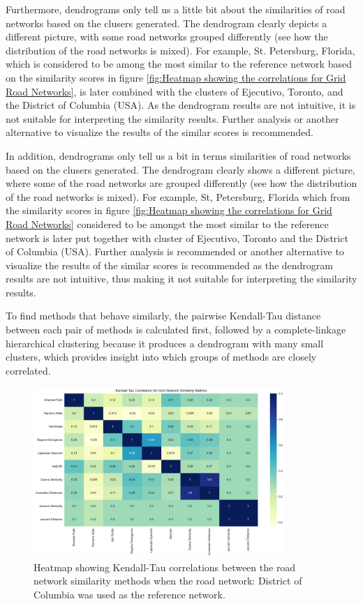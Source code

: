 Furthermore, dendrograms only tell us a little bit about the similarities of road networks based on the clusers generated. The dendrogram clearly depicts a different picture, with some road networks grouped differently (see how the distribution of the road networks is mixed). For example, St. Petersburg, Florida, which is considered to be among the most similar to the reference network based on the similarity scores in figure \ref{fig:Heatmap showing the correlations for Grid Road Networks}, is later combined with the clusters of Ejecutivo, Toronto, and the District of Columbia (USA). As the dendrogram results are not intuitive, it is not suitable for interpreting the similarity results. Further analysis or another alternative to visualize the results of the similar scores is recommended.

In addition, dendrograms only tell us a bit in terms similarities of road networks based on the clusers generated. The dendrogram clearly shows a different picture, where some of the road networks are grouped differently (see how the distribution of the road networks is mixed). For example, St, Petersburg, Florida which from the similarity scores in figure \ref{fig:Heatmap showing the correlations for Grid Road Networks} considered to be amongst the most similar to the reference network is later put together with cluster of Ejecutivo, Toronto and the District of Columbia (USA). Further analysis is recommended or another alternative to visualize the results of the similar scores is recommended as the dendrogram results are not intuitive, thus making it not suitable for interpreting the similarity results.

To find methods that behave similarly, the pairwise Kendall-Tau distance between each pair of methods is calculated first, followed by a complete-linkage hierarchical clustering because it produces a dendrogram with many small clusters, which provides insight into which groups of methods are closely correlated.

\begin{figure}[!ht]
\centering
\includegraphics[width=0.85\textwidth,center]{picture/Grid/grid2.png}
\caption[Heatmap showing Kendall-Tau correlations between the road network similarity methods for Grid Road Networks]{Heatmap showing Kendall-Tau correlations between the road network similarity methods when the road network: District of Columbia was used as the reference network.}
\label{fig:network ranking}
\end{figure}

